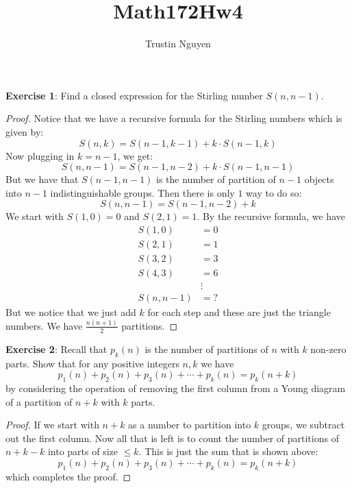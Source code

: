 \documentclass{article}
\title{Math172Hw4}
\author{Trustin Nguyen}
\begin{document}
    \maketitle

\reversemarginpar

\textbf{Exercise 1}: Find a closed expression for the Stirling number $S(n, n - 1)$.
    \begin{proof}
        Notice that we have a recursive formula for the Stirling numbers which is given by:
            \begin{equation*}
                S(n, k) = S(n - 1, k - 1) + k \cdot S(n - 1, k)
            \end{equation*}
        Now plugging in $k = n - 1$, we get:
            \begin{equation*}
                S(n, n - 1) = S(n - 1, n - 2) + k \cdot S(n - 1, n - 1)
            \end{equation*}
        But we have that $S(n - 1, n - 1)$ is the number of partition of $n - 1$ objects into $n - 1$ indistinguishable groups. Then there is only $1$ way to do so:
            \begin{equation*}
                S(n, n - 1) = S(n - 1, n - 2) + k
            \end{equation*}
        We start with $S(1, 0) = 0$ and $S(2, 1) = 1$. By the recursive formula, we have
            \begin{align*}
                S(1, 0)     &=       0 \\
                S(2, 1)     &=       1 \\
                S(3, 2)     &=       3 \\
                S(4, 3)     &=       6 \\
                            &\vdots    \\
                S(n, n - 1) &=       ?   
            \end{align*}
        But we notice that we just add $k$ for each step and these are just the triangle numbers. We have $\frac{n(n + 1)}{2}$ partitions.
    \end{proof}

\textbf{Exercise 2}: Recall that $p_{k}(n)$ is the number of partitions of $n$ with $k$ non-zero parts. Show that for any positive integers $n, k$ we have
    \begin{equation*}
        p_{1}(n) + p_{2}(n) + p_{3}(n) + \cdots + p_{k}(n) = p_{k}(n + k)
    \end{equation*}
by considering the operation of removing the first column from a Young diagram of a partition of $n + k$ with $k$ parts.
    \begin{proof}
        If we start with $n + k$ as a number to partition into $k$ groups, we subtract out the first column. Now all that is left is to count the number of partitions of $n + k - k$ into parts of size $\leq k$. This is just the sum that is shown above:
            \begin{equation*}
                p_{1}(n) + p_{2}(n) + p_{3}(n) + \cdots + p_{k}(n) = p_{k}(n + k)
            \end{equation*}
        which completes the proof.
    \end{proof}
\end{document}
